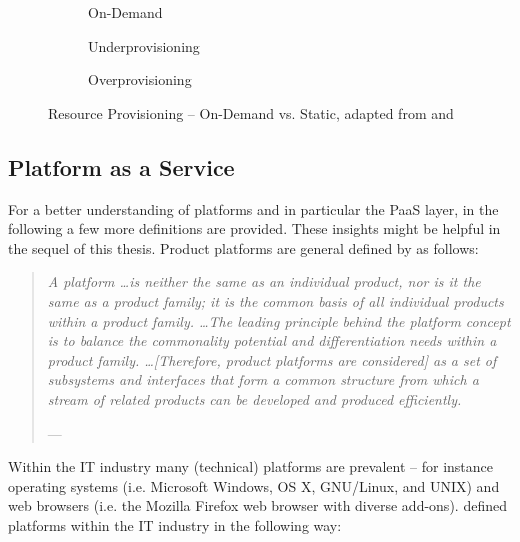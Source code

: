 \begin{figure}[tb]
	\centering
	\begin{subfigure}{.75\textwidth}
		\centering
		
		\caption{On-Demand}\label{fig:rpc}
	\end{subfigure}
	\begin{subfigure}[b]{.75\textwidth}
		\centering
		
		\caption{Underprovisioning}\label{fig:rpu}
	\end{subfigure}
	\begin{subfigure}[b]{.75\textwidth}
		\centering
		
		\caption{Overprovisioning}\label{fig:rpo}
	\end{subfigure}
	\caption[Resource Provisioning -- On-Demand vs. Static]{Resource Provisioning -- On-Demand vs. Static, adapted from \citet[p. 54]{Armbrust2010} and \citet[p. 127]{Iyer2010}}
	\label{fig:rp}
\end{figure}

\subsection{Platform as a Service}

For a better understanding of platforms and in particular the \ac{PaaS} layer, in the following a few more definitions are provided. These insights might be helpful in the sequel of this thesis. Product platforms are general defined by \citet{Halman2003} as follows:

\begin{quotation}{\slshape 
A platform \ldots is neither the same as an individual product, nor is it the same as a product family; it is the common basis of all individual products within a product family. \ldots The leading principle behind the platform concept is to balance the commonality potential and differentiation needs within a product family. \ldots [Therefore, product platforms are considered] as a set of subsystems and interfaces that form a common structure from which a stream of related products can be developed and produced efficiently.}
\vspace*{-7pt}
\begin{flushright}
	--- \citealp[pp. 150-151]{Halman2003}
\end{flushright}
\end{quotation}

Within the IT industry many (technical) platforms are prevalent -- for instance operating systems (i.e. Microsoft Windows, OS X, GNU/Linux, and UNIX) and web browsers (i.e. the Mozilla Firefox web browser with diverse add-ons). \citet{Poel2007} defined platforms within the IT industry in the following way:

